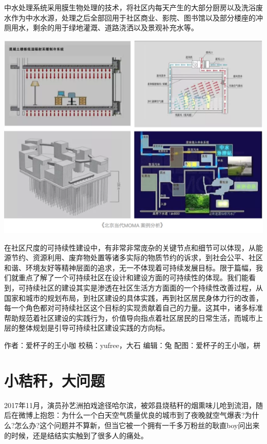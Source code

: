 \documentclass[]{book}
\begin{document}
中水处理系统采用膜生物处理的技术，将社区内每天产生的大部分厨房以及洗浴废水作为中水水源，处理之后全部回用于社区商业、影院、图书馆以及部分楼座的冲厕用水，剩余的用于绿地灌溉、道路浇洒以及景观补充水等。

\includegraphics[width=8.33in]{images/moma6}

在社区尺度的可持续性建设中，有非常非常庞杂的关键节点和细节可以体现，从能源节约、资源利用、废弃物处置等诸多实际的物质节约的诉求，到社会公平、社区和谐、环境友好等精神层面的追求，无一不体现着可持续发展目标。限于篇幅，我们就重点了解了一个可持续社区在设计和建设方面的可持续性的体现。我们能看到，可持续社区的建设其实是渗透在社区生活方方面面的一个持续性改善过程，从国家和城市的规划布局，到社区建设的具体实践，再到社区居民身体力行的改善，每一个角色都对可持续社区这个目标的实现贡献着自己的力量。这其中，诸多标准帮助规范着社区建设的实践行为，价值导向指点着社区居民的日常生活，而城市上层的整体规划是引导可持续社区建设实践的方向标。

作者：爱杯子的王小咖 校稿：yufree，大石 编辑：兔
配图：爱杯子的王小咖，栟

\section{小秸秆，大问题}

2017年11月，演员孙艺洲拍戏途径哈尔滨，被郊县烧秸秆的烟熏味儿呛到流泪，随后在微博上抱怨：为什么一个白天空气质量优良的城市到了夜晚就空气爆表?为什么?怎么办?这个问题并不算新，但当它被一个拥有一千多万粉丝的耿直boy问出来的时候，还是结结实实触到了很多人的痛处。
\end{document}

